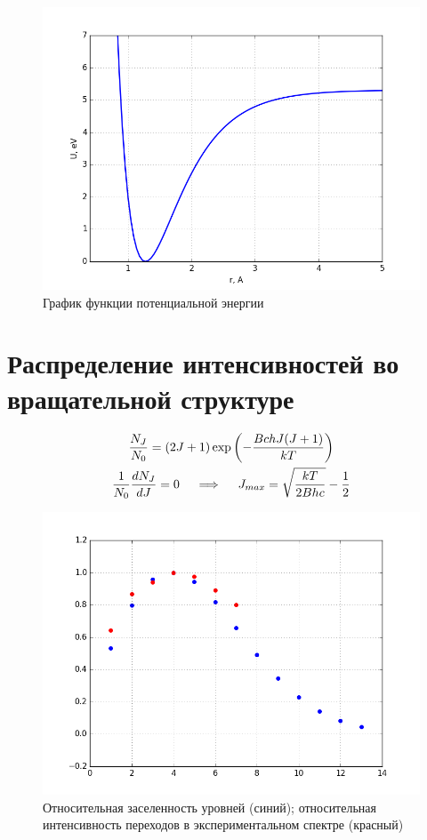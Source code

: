 \documentclass[13pt]{extarticle}
\newcommand{\lb}{\left(}
\newcommand{\rb}{\right)}
\begin{document}
\begin{figure}[!ht]
	\centering
	\includegraphics[scale=0.5]{pictures/potential.png}
	\caption{График функции потенциальной энергии}
\end{figure}

\section{Распределение интенсивностей во вращательной структуре}

\begin{gather}
	\frac{N_J}{N_0} = \lb 2 J + 1 \rb \exp \lb -\frac{B c h J ( J + 1 )}{kT} \rb \notag \\
	\frac{1}{N_0} \frac{d N_J}{d J} = 0 \quad \implies \quad J_{max} = \sqrt{ \frac{k T}{2 B h c} } - \frac{1}{2} \notag
\end{gather}

\begin{figure}[!ht]
	\centering
	\includegraphics[scale=0.5]{pictures/population.png}
	\caption{Относительная заселенность уровней (синий);  \newline относительная интенсивность переходов в экспериментальном спектре (красный)}
\end{figure}
\end{document}
